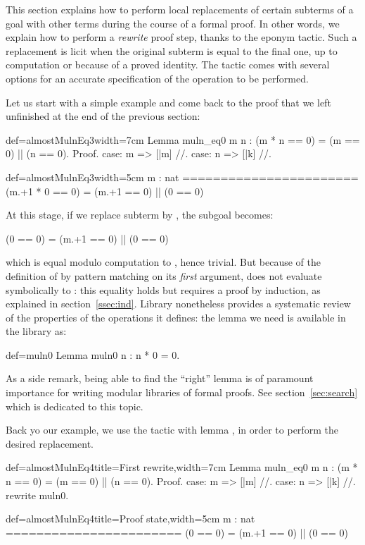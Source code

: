 This section explains how to perform local replacements of certain
subterms of a goal with other terms during the course of a formal
proof. In other words, we explain how to perform a
\emph{rewrite} proof step, thanks to the eponym  tactic.
Such a replacement is licit when the original subterm is equal
to the final one, up to computation or because of a proved
identity. The  tactic comes with several options for
an accurate specification of the operation to be performed.

Let us start with a simple example and come back to the proof that we
left unfinished at the end of the previous section:

\begin{coq}{def=almostMulnEq3}{width=7cm}
Lemma muln_eq0 m n :
  (m * n == 0) = (m == 0) || (n == 0).
Proof.
case: m => [|m] //.
case: n => [|k] //.
\end{coq}
\begin{coqout}{def=almostMulnEq3}{width=5cm}
m : nat
=======================
(m.+1 * 0 == 0) =
  (m.+1 == 0) || (0 == 0)
\end{coqout}
At this stage, if we replace subterm  by , the
subgoal becomes:

\begin{coqout}{}{}
(0 == 0) = (m.+1 == 0) || (0 == 0)
\end{coqout}
which is equal modulo computation to , hence trivial.
But because of
the definition of  by pattern matching on its \emph{first}
argument,  does not evaluate symbolically to : this
equality holds but requires a proof by induction, as explained in
section~\ref{ssec:ind}.
Library \mcbMC{} nonetheless provides a systematic review of the
properties of the operations it defines: the lemma we need is
available in the library as:

\begin{coq}{def=muln0}{}
Lemma muln0 n : n * 0 = 0.
\end{coq}

As a side remark, being able to find the ``right'' lemma is of
paramount importance for writing modular libraries of formal
proofs. See section~\ref{sec:search} which is dedicated to this topic.

Back yo our example, we use the  tactic with lemma
, in order to perform the desired replacement.

\begin{coq}{def=almostMulnEq4}{title=First rewrite,width=7cm}
Lemma muln_eq0 m n :
  (m * n == 0) = (m == 0) || (n == 0).
Proof.
case: m => [|m] //.
case: n => [|k] //.
rewrite muln0.
\end{coq}
\begin{coqout}{def=almostMulnEq4}{title=Proof state,width=5cm}
m : nat
=======================
(0 == 0) =
  (m.+1 == 0) || (0 == 0)
\end{coqout}

